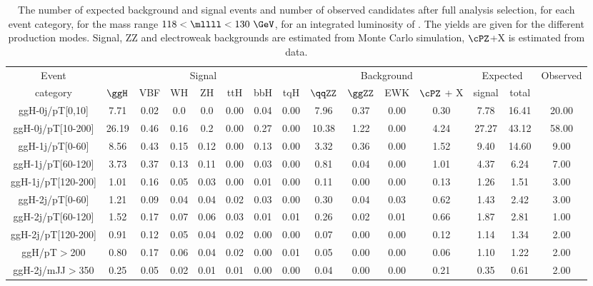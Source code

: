 \begin{table}[htb]
	\begin{center}
		\small
		\caption{The number of expected background and signal events and number of observed candidates after full analysis selection, for each event category, for the mass range $118<\mllll<130~\GeV$, for an integrated luminosity of \usedLumiB.
			The yields are given for the different production modes.
			Signal, ZZ and electroweak backgrounds are estimated from Monte Carlo simulation, 
			$\cPZ$+X is estimated from data.
			\label{tab:EventYieldsPeakCategB}}
		\resizebox{\textwidth}{!}
		{
				\begin{tabular}{cccccccc|cccc|cc|c}
				\hline
				\hline
				Event & \multicolumn{7}{c|}{Signal} & \multicolumn{4}{c|}{Background} &  \multicolumn{2}{c|}{Expected} & Observed \\
				category             & $\ggH$ &VBF    &WH    &ZH    &ttH   &bbH   &tqH   &$\qqZZ$  &$\ggZZ$  & EWK & $\cPZ$ + X & signal&total& \\
				\hline
ggH-0j/pT[0,10] & 7.71 & 0.02 & 0.0 & 0.0 & 0.00 & 0.04 & 0.00 & 7.96 & 0.37 & 0.00 & 0.30 & 7.78 & 16.41 & 20.00
\\
ggH-0j/pT[10-200] & 26.19 & 0.46 & 0.16 & 0.2 & 0.00 & 0.27 & 0.00 & 10.38 & 1.22 & 0.00 & 4.24 & 27.27 & 43.12 & 58.00
\\
ggH-1j/pT[0-60] & 8.56 & 0.43 & 0.15 & 0.12 & 0.00 & 0.13 & 0.00 & 3.32 & 0.36 & 0.00 & 1.52 & 9.40 & 14.60 & 9.00
\\
ggH-1j/pT[60-120] & 3.73 & 0.37 & 0.13 & 0.11 & 0.00 & 0.03 & 0.00 & 0.81 & 0.04 & 0.00 & 1.01 & 4.37 & 6.24 & 7.00
\\
ggH-1j/pT[120-200] & 1.01 & 0.16 & 0.05 & 0.03 & 0.00 & 0.01 & 0.00 & 0.11 & 0.00 & 0.00 & 0.13 & 1.26 & 1.51 & 3.00
\\
ggH-2j/pT[0-60] & 1.21 & 0.09 & 0.04 & 0.04 & 0.02 & 0.03 & 0.00 & 0.30 & 0.04 & 0.03 & 0.62 & 1.43 & 2.42 & 3.00
\\
ggH-2j/pT[60-120] & 1.52 & 0.17 & 0.07 & 0.06 & 0.03 & 0.01 & 0.01 & 0.26 & 0.02 & 0.01 & 0.66 & 1.87 & 2.81 & 1.00
\\
ggH-2j/pT[120-200] & 0.91 & 0.12 & 0.05 & 0.04 & 0.02 & 0.00 & 0.00 & 0.07 & 0.00 & 0.00 & 0.12 & 1.14 & 1.34 & 2.00
\\
ggH/pT$>$200 & 0.80 & 0.17 & 0.06 & 0.04 & 0.02 & 0.00 & 0.01 & 0.05 & 0.00 & 0.00 & 0.06 & 1.10 & 1.22 & 2.00
\\
ggH-2j/mJJ$>$350 & 0.25 & 0.05 & 0.02 & 0.01 & 0.01 & 0.00 & 0.00 & 0.04 & 0.00 & 0.00 & 0.21 & 0.35 & 0.61 & 2.00

\end{tabular}}
\end{center}
\end{table}
